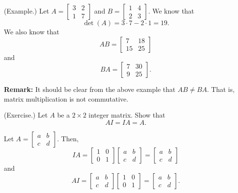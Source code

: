\documentclass[letterpaper]{article}
\begin{document}
\begin{mdframed}
    (Example.) Let $A = \begin{bmatrix}
        3 & 2 \\ 1 & 7
    \end{bmatrix}$ and $B = \begin{bmatrix}
        1 & 4 \\ 2 & 3
    \end{bmatrix}$. We know that \[\det(A) = 3 \cdot 7 - 2 \cdot 1 = 19.\] We also know that \[AB = \begin{bmatrix}
        7 & 18 \\ 15 & 25
    \end{bmatrix}\] and \[BA = \begin{bmatrix}
        7 & 30 \\ 9 & 25
    \end{bmatrix}.\] 
\end{mdframed}
\textbf{Remark:} It should be clear from the above example that $AB \neq BA$. That is, matrix multiplication is not commutative. 

\begin{mdframed}
    (Exercise.) Let $A$ be a $2 \times 2$ integer matrix. Show that \[AI = IA = A.\]

    \begin{mdframed}
        Let $A = \begin{bmatrix}
            a & b \\ 
            c & d
        \end{bmatrix}.$ Then, 
        \[IA = \begin{bmatrix}
            1 & 0 \\ 
            0 & 1
        \end{bmatrix} \begin{bmatrix}
            a & b \\ 
            c & d
        \end{bmatrix} = \begin{bmatrix}
            a & b \\ 
            c & d
        \end{bmatrix}\]
        and 
        \[AI = \begin{bmatrix}
            a & b \\ 
            c & d
        \end{bmatrix} \begin{bmatrix}
            1 & 0 \\ 
            0 & 1
        \end{bmatrix} = \begin{bmatrix}
            a & b \\ 
            c & d
        \end{bmatrix}.\]
    \end{mdframed}
\end{mdframed}
\end{document}
